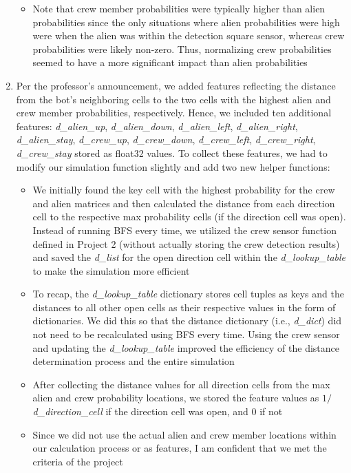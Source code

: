 \documentclass[11pt]{article}
\begin{document}
\begin{enumerate}
\begin{itemize}
        \item Note that crew member probabilities were typically higher than alien probabilities since the only situations where alien probabilities were high were when the alien was within the detection square sensor, whereas crew probabilities were likely non-zero. Thus, normalizing crew probabilities seemed to have a more significant impact than alien probabilities
    \end{itemize}
    \item Per the professor's announcement, we added features reflecting the distance from the bot's neighboring cells to the two cells with the highest alien and crew member probabilities, respectively. Hence, we included ten additional features: \emph{d\_alien\_up}, \emph{d\_alien\_down}, \emph{d\_alien\_left}, \emph{d\_alien\_right}, \emph{d\_alien\_stay}, \emph{d\_crew\_up}, \emph{d\_crew\_down}, \emph{d\_crew\_left}, \emph{d\_crew\_right}, \emph{d\_crew\_stay} stored as float32 values. To collect these features, we had to modify our simulation function slightly and add two new helper functions:
    \begin{itemize}
        \item We initially found the key cell with the highest probability for the crew and alien matrices and then calculated the distance from each direction cell to the respective max probability cells (if the direction cell was open). Instead of running BFS every time, we utilized the crew sensor function defined in Project 2 (without actually storing the crew detection results) and saved the \emph{d\_list} for the open direction cell within the \emph{d\_lookup\_table} to make the simulation more efficient 
        \item To recap, the \emph{d\_lookup\_table} dictionary stores cell tuples as keys and the distances to all other open cells as their respective values in the form of dictionaries. We did this so that the distance dictionary (i.e., \emph{d\_dict}) did not need to be recalculated using BFS every time. Using the crew sensor and updating the \emph{d\_lookup\_table} improved the efficiency of the distance determination process and the entire simulation
        \item After collecting the distance values for all direction cells from the max alien and crew probability locations, we stored the feature values as $1/$\emph{d\_direction\_cell} if the direction cell was open, and 0 if not
        \item Since we did not use the actual alien and crew member locations within our calculation process or as features, I am confident that we met the criteria of the project

\end{itemize}
\end{enumerate}
\end{document}
